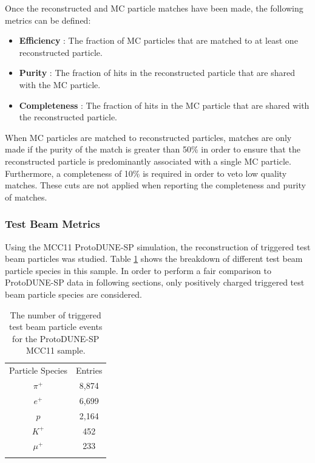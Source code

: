 Once the reconstructed and MC particle matches have been made, the following metrics can be defined:

\begin{itemize}
\item \textbf{Efficiency} : The fraction of MC particles that are matched to at least one reconstructed particle.
\item \textbf{Purity} : The fraction of hits in the reconstructed particle that are shared with the MC particle.
\item \textbf{Completeness} : The fraction of hits in the MC particle that are shared with the reconstructed particle.
\end{itemize}

When MC particles are matched to reconstructed particles, matches are only made if the purity of the match is greater than 50\% in order to ensure that the reconstructed particle is predominantly associated with a single MC particle.  Furthermore, a completeness of 10\% is required in order to veto low quality matches.  These cuts are not applied when reporting the completeness and purity of matches.  

\subsubsection{Test Beam Metrics}
Using the MCC11 ProtoDUNE-SP simulation, the reconstruction of triggered test beam particles was studied.  Table \ref{tab:mcc11species} shows the breakdown of different test beam particle species in this sample.  In order to perform a fair comparison to ProtoDUNE-SP data in following sections, only positively charged triggered test beam particle species are considered.

\begin{table}
\centering
\caption{The number of triggered test beam particle events for the ProtoDUNE-SP MCC11 sample.}
\label{tab:mcc11species} 
\begin{tabular}{cc}
\hline\noalign{\smallskip}
Particle Species & Entries  \\
\noalign{\smallskip}\hline\noalign{\smallskip}
$\pi^{+}$ & 8,874 \\
$e^{+}$ & 6,699 \\
$p$ & 2,164 \\
$K^{+}$ & 452 \\
$\mu^{+}$ & 233 \\
\noalign{\smallskip}\hline
\end{tabular}
\end{table}


